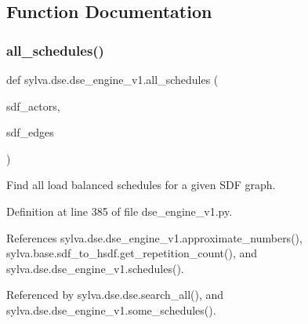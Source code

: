 \subsection{Function Documentation}
\mbox{\label{namespacesylva_1_1dse_1_1dse__engine__v1_a8ca06c203c74d5cd06866a67203d251c}} 
\subsubsection{\texorpdfstring{all\+\_\+schedules()}{all\_schedules()}}
{\footnotesize\ttfamily def sylva.\+dse.\+dse\+\_\+engine\+\_\+v1.\+all\+\_\+schedules (\begin{DoxyParamCaption}\item[{}]{sdf\+\_\+actors,  }\item[{}]{sdf\+\_\+edges }\end{DoxyParamCaption})}

\begin{DoxyVerb}  Find all load balanced schedules for a given SDF graph.
\end{DoxyVerb}
 

Definition at line 385 of file dse\+\_\+engine\+\_\+v1.\+py.



References sylva.\+dse.\+dse\+\_\+engine\+\_\+v1.\+approximate\+\_\+numbers(), sylva.\+base.\+sdf\+\_\+to\+\_\+hsdf.\+get\+\_\+repetition\+\_\+count(), and sylva.\+dse.\+dse\+\_\+engine\+\_\+v1.\+schedules().



Referenced by sylva.\+dse.\+dse.\+search\+\_\+all(), and sylva.\+dse.\+dse\+\_\+engine\+\_\+v1.\+some\+\_\+schedules().


